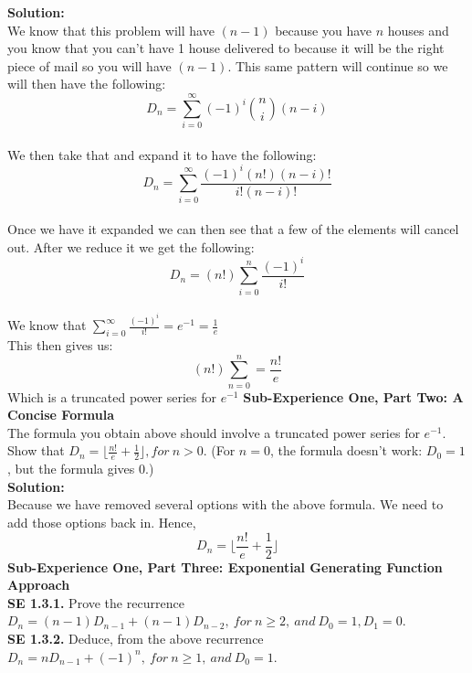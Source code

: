 \documentclass[10pt,a4paper]{report}
\begin{document}
	\textbf{Solution: }\\
	\newline
	We know that this problem will have $(n-1)$ because you have $n$ houses and you know that you can't have 1 house delivered to because it will be the right piece of mail so you will have $(n-1)$.  This same pattern will continue so we will then have the following:\\
	\[D_n = \sum_{i=0}^{\infty} (-1)^i\binom{n}{i}(n-i)\]\\
	We then take that and expand it to have the following:\\
	\[D_n = \sum_{i=0}^{\infty}\frac{(-1)^i(n!)(n-i)!}{i!(n-i)!}\]\\
	Once we have it expanded we can then see that a few of the elements will cancel out.  After we reduce it we get the following:\\
	\[D_n = (n!)\sum_{i=0}^{n}\frac{(-1)^i}{i!}\]\\
	We know that $\sum_{i=0}^{\infty}\frac{(-1)^i}{i!} = e^{-1} = \frac{1}{e}$\\
	This then gives us:
	\[(n!)\sum_{n=0}^{n} = \frac{n!}{e}\]
	Which is a truncated power series for $e^{-1}$
	\newline
	\newline
	\textbf{Sub-Experience One, Part Two: A Concise Formula}\\
	The formula you obtain above should involve a truncated power series for $e^{-1}$.  Show that $D_n = \lfloor\frac{n!}{e}+\frac{1}{2}\rfloor, for\ n > 0$. (For $n=0$, the formula doesn't work: $D_0 = 1$, but the formula gives 0.)\\
	\newline
	\textbf{Solution: }\\
	\newline
	Because we have removed several options with the above formula.  We need to add those options back in. Hence,\\
	\[D_n = \lfloor\frac{n!}{e}+\frac{1}{2}\rfloor\]
	\newline
	\textbf{Sub-Experience One, Part Three: Exponential Generating Function Approach}\\
	\newline
	\textbf{SE 1.3.1.} Prove the recurrence $D_n = (n-1)D_{n-1} + (n-1)D_{n-2},\ for\ n\geq 2,\ and\ D_0 = 1, D_1=0$.\\
	\textbf{SE 1.3.2.} Deduce, from the above recurrence $D_n = nD_{n-1}+(-1)^n,\ for\ n\geq 1,\ and\ D_0 = 1$.\\
\end{document}
